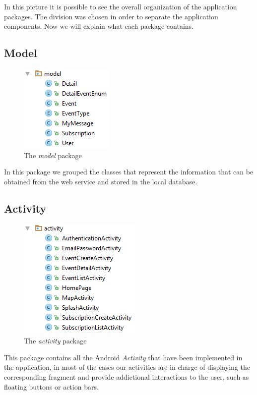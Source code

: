 \documentclass[a4paper]{scrreprt}
\begin{document}
In this picture it is possible to see the overall organization of the application packages. The division was chosen in order to separate the application components. Now we will explain what each package contains.

\subsection{Model}
\begin{figure}[H]
	\centering
	\includegraphics{imgs/pack_model}
	\caption{The \emph{model} package}
\end{figure}
In this package we grouped the classes that represent the information that can be obtained from the web service and stored in the local database.

\subsection{Activity}
\begin{figure}[H]
	\centering
	\includegraphics{imgs/pack_activity}
	\caption{The \emph{activity} package}
\end{figure}
This package contains all the Android \emph{Activity} that have been implemented in the application, in most of the cases our activities are in charge of displaying the corresponding fragment and provide addictional interactions to the user, such as floating buttons or action bars.
\end{document}
